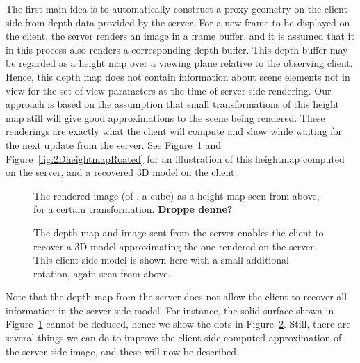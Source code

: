 The first main idea is to automatically construct a proxy geometry on the client
side from depth data provided by the server. For a new frame to be displayed on
the client, the server renders an image in a frame buffer, and it is assumed
that it in this process also renders a corresponding depth buffer. This depth
buffer may be regarded as a height map over a viewing plane relative to the
observing client. Hence, this depth map does not contain information about scene
elements not in view for the set of view parameters at the time of server side
rendering. Our approach is based on the assumption that small transformations of
this height map still will give good approximations to the scene being
rendered. These renderings are exactly what the client will compute and show
while waiting for the next update from the server. See
Figure~\ref{fig:2Dheightmap} and Figure~\ref{fig:2DheightmapRoated} for an
illustration of this heightmap computed on the server, and a recovered 3D model
on the client.

\begin{figure}[htb]
  \centering
  
  \caption{\label{fig:2Dheightmap}
           The rendered image (of \eg, a cube) as a height map seen from above,
           for a certain transformation. \textbf{Droppe denne?}}
\end{figure}

\begin{figure}[htb]
  \centering
  \caption{\label{fig:2DheightmapRotated}
           The depth map and image sent from the server enables the client to
           recover a 3D model approximating the one rendered on the server. This
           client-side model is shown here with a small additional rotation, again
           seen from above.}
\end{figure}

Note that the depth map from the server does not allow the client to recover all
information in the server side model. For instance, the solid surface shown in
Figure~\ref{fig:2Dheightmap} cannot be deduced, hence we show the dots in
Figure~\ref{fig:2DheightmapRotated}. Still, there are several things we can do
to improve the client-side computed approximation of the server-side image, and
these will now be described.

